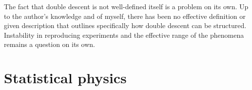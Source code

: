 \documentclass[10pt]{article} %
\begin{document}
The fact that double descent is not well-defined itself is a problem on its own. Up to the author's knowledge and of myself, there has been no effective definition or given description that outlines specifically how double descent can be structured. Instability in reproducing experiments and the effective range of the phenomena remains a question on its own. 

\section{Statistical physics}



\clearpage




\clearpage
\end{document}
